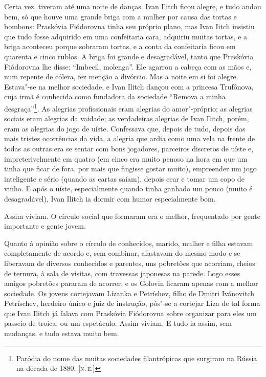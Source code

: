 Certa vez, tiveram até uma noite de danças. Ivan Ilitch ficou alegre, e
tudo andou bem, só que houve uma grande briga com a mulher por causa das
tortas e bombons: Praskóvia Fiódorovna tinha seu próprio plano, mas Ivan
Iitch insistiu que tudo fosse adquirido em uma confeitaria cara,
adquiriu muitas tortas, e a briga aconteceu porque sobraram tortas, e a
conta da confeitaria ficou em quarenta e cinco rublos. A briga foi
grande e desagradável, tanto que Praskóvia Fiódorovna lhe disse:
``Imbecil, molenga''. Ele agarrou a cabeça com as mãos e, num repente de
cólera, fez menção a divórcio. Mas a noite em si foi alegre. Estava"-se
na melhor sociedade, e Ivan Ilitch dançou com a princesa Trufônova, cuja
irmã é conhecida como fundadora da sociedade ``Remova a minha
desgraça''\footnote{Paródia do nome das muitas sociedades filantrópicas
  que surgiram na Rússia na década de 1880. {[}\textsc{n.\,e.}{]}}. As alegrias
profissionais eram alegrias do amor"-próprio; as alegrias sociais eram
alegrias da vaidade; as verdadeiras alegrias de Ivan Ilitch, porém, eram
as alegrias do jogo de uíste. Confessava que, depois de tudo, depois das
mais tristes ocorrências da vida, a alegria que ardia como uma vela na
frente de todas as outras era se sentar com bons jogadores, parceiros
discretos de uíste e, impreterivelmente em quatro (em cinco era muito
penoso na hora em que um tinha que ficar de fora, por mais que fingisse
gostar muito), empreender um jogo inteligente e sério (quando as cartas
saíam), depois cear e tomar um copo de vinho. E após o uíste,
especialmente quando tinha ganhado um pouco (muito é desagradável), Ivan
Ilitch ia dormir com humor especialmente bom.

Assim viviam. O círculo social que formaram era o melhor, frequentado
por gente importante e gente jovem.

Quanto à opinião sobre o círculo de conhecidos, marido, mulher e filha
estavam completamente de acordo e, sem combinar, afastavam do mesmo modo
e se liberavam de diversos conhecidos e parentes, uns pobretões que
acorriam, cheios de ternura, à sala de visitas, com travessas japonesas
na parede. Logo esses amigos pobretões pararam de acorrer, e os Golovin
ficaram apenas com a melhor sociedade. Os jovens cortejavam Lízanka e
Petríshev, filho de Dmitri Ivánovitch Petríschev, herdeiro único e juiz
de instrução, pôs"-se a cortejar Liza de tal forma que Ivan Ilitch já
falava com Praskóvia Fiódorovna sobre organizar para eles um passeio de
troica, ou um espetáculo. Assim viviam. E tudo ia assim, sem mudanças, e
tudo estava muito bem.

